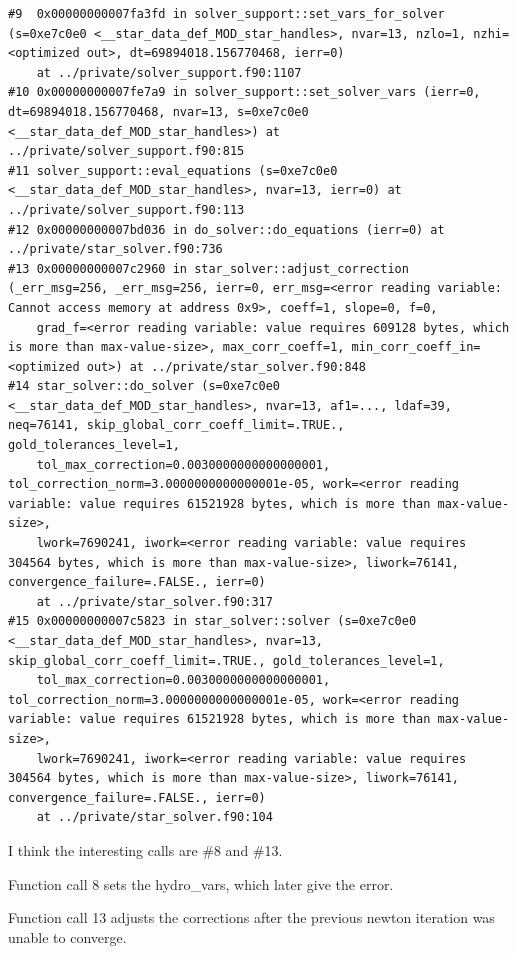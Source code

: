 \documentclass[a4paper,10pt]{article}
\begin{document}
\begin{verbatim}
#9  0x00000000007fa3fd in solver_support::set_vars_for_solver (s=0xe7c0e0 <__star_data_def_MOD_star_handles>, nvar=13, nzlo=1, nzhi=<optimized out>, dt=69894018.156770468, ierr=0)
    at ../private/solver_support.f90:1107
#10 0x00000000007fe7a9 in solver_support::set_solver_vars (ierr=0, dt=69894018.156770468, nvar=13, s=0xe7c0e0 <__star_data_def_MOD_star_handles>) at ../private/solver_support.f90:815
#11 solver_support::eval_equations (s=0xe7c0e0 <__star_data_def_MOD_star_handles>, nvar=13, ierr=0) at ../private/solver_support.f90:113
#12 0x00000000007bd036 in do_solver::do_equations (ierr=0) at ../private/star_solver.f90:736
#13 0x00000000007c2960 in star_solver::adjust_correction (_err_msg=256, _err_msg=256, ierr=0, err_msg=<error reading variable: Cannot access memory at address 0x9>, coeff=1, slope=0, f=0, 
    grad_f=<error reading variable: value requires 609128 bytes, which is more than max-value-size>, max_corr_coeff=1, min_corr_coeff_in=<optimized out>) at ../private/star_solver.f90:848
#14 star_solver::do_solver (s=0xe7c0e0 <__star_data_def_MOD_star_handles>, nvar=13, af1=..., ldaf=39, neq=76141, skip_global_corr_coeff_limit=.TRUE., gold_tolerances_level=1, 
    tol_max_correction=0.0030000000000000001, tol_correction_norm=3.0000000000000001e-05, work=<error reading variable: value requires 61521928 bytes, which is more than max-value-size>, 
    lwork=7690241, iwork=<error reading variable: value requires 304564 bytes, which is more than max-value-size>, liwork=76141, convergence_failure=.FALSE., ierr=0)
    at ../private/star_solver.f90:317
#15 0x00000000007c5823 in star_solver::solver (s=0xe7c0e0 <__star_data_def_MOD_star_handles>, nvar=13, skip_global_corr_coeff_limit=.TRUE., gold_tolerances_level=1, 
    tol_max_correction=0.0030000000000000001, tol_correction_norm=3.0000000000000001e-05, work=<error reading variable: value requires 61521928 bytes, which is more than max-value-size>, 
    lwork=7690241, iwork=<error reading variable: value requires 304564 bytes, which is more than max-value-size>, liwork=76141, convergence_failure=.FALSE., ierr=0)
    at ../private/star_solver.f90:104
\end{verbatim}
I think the interesting calls are \#8 and \#13.
\begin{citemize}
    \item   Function call 8 sets the hydro\_vars, which later give the error.
    \item  Function call 13 adjusts the corrections after the previous newton iteration was unable to converge.
\end{citemize}
\end{document}
